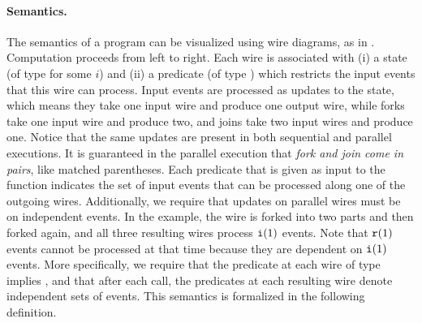 \paragraph{Semantics.}
The semantics of a program
can be visualized using wire
diagrams, as in . Computation proceeds from left to right. Each wire is associated with
(i) a state (of type  for some $i$) and
(ii) a predicate (of type )
which restricts the input events that this wire can process.
Input events are processed as
updates to the state, which means they take one input wire and produce
one output wire, while forks take one input wire and produce two, and
joins take two input wires and produce one. Notice that the same updates are present in both sequential and parallel executions. It is guaranteed in the
parallel execution that \emph{fork and join come in pairs}, like
matched parentheses. Each predicate that is given as input to the  function indicates the set of input events that can be processed along one of the outgoing wires.
Additionally, we require that updates on parallel wires must be
on independent events.
In the example,
the wire is forked into two parts and then forked again, and all three
resulting wires process $\texttt{i}(1)$ events. Note that $\texttt{r}(1)$
events cannot be processed at that time because they are dependent on
$\texttt{i}(1)$ events.
More specifically, we require that
the predicate at each wire of type 
implies , and that
after each  call,
the predicates at each resulting wire denote independent sets of events.
This semantics is formalized in the following definition.

